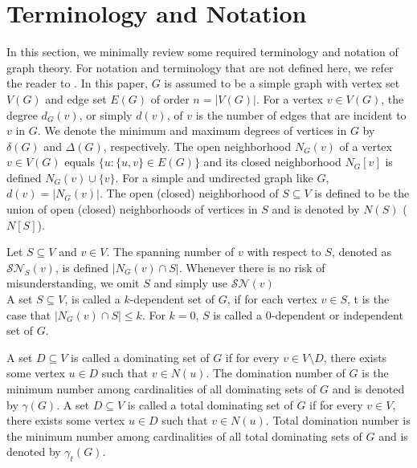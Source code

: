 \documentclass[A4,12pt]{article}
\newcommand{\spann}{\mathcal{SN}}
\theoremstyle{definition}
\theoremstyle{remark}
\begin{document}
	
	
	\section{Terminology and Notation}\label{Terminology}
	In this section, we minimally review some required terminology and notation of graph theory. For notation and terminology that are not defined here, we refer the reader to \cite{west2001introduction}. In this paper, $G$ is assumed to be a simple graph with vertex set $V(G)$ and edge set $E(G)$ of order $n=\vert V(G)\vert$. For a vertex $v \in V(G)$, the degree $d_{G}(v)$, or simply $d(v)$, of $v$ is the number of edges that are incident to $v$ in $G$. We denote the minimum and maximum degrees of vertices in $G$ by $\delta(G)$ and $\Delta(G)$, respectively.
	The open neighborhood $N_G(v)$ of a vertex $v\in V(G)$ equals $\{u :
	\{u,v\} \in E(G)\}$ and its closed neighborhood $N_G[v]$  is defined $N_G(v) \cup \{v\}$. For a simple and undirected graph like $G$, $d(v) = |N_G(v)|$. The open (closed) neighborhood of $S \subseteq V$ is defined to be the union of open (closed) neighborhoods of vertices in $S$ and is denoted by $N(S)$ ($N[S]$).
	
	
	
	Let $S \subseteq V$ and $v\in V$. The spanning number of $v$ with respect to $S$, denoted as $\spann_{S}(v)$, is defined $\vert N_G(v)\cap S\vert $. Whenever there is no risk of misunderstanding, we omit $S$ and simply use  $\spann(v)$
	\\
	A set $S \subseteq V$,  is called a $k$-dependent set of $G$, if for each vertex $v \in S$, t is the case that $\vert N_G(v) \cap S\vert\leq k$. For $k=0$, $S$ is called a $0$-dependent or independent set of $G$.
	
	
	A set $D \subseteq V$ is called a dominating set of $G$ if for every $v \in V \setminus D$, there exists some vertex $u\in D$ such that $v \in N(u)$.
	The domination number of $G$ is the minimum number among cardinalities of all dominating sets of $G$ and is denoted by $\gamma(G)$.
	A set $D \subseteq V$ is called a total dominating set of $G$ if for every $v \in V$, there exists some vertex $u\in D$ such that $v \in N(u)$. Total domination number is the minimum number among cardinalities of all  total dominating sets of $G$ and is denoted by $\gamma_{t}(G)$.
	
	
	
\end{document}
